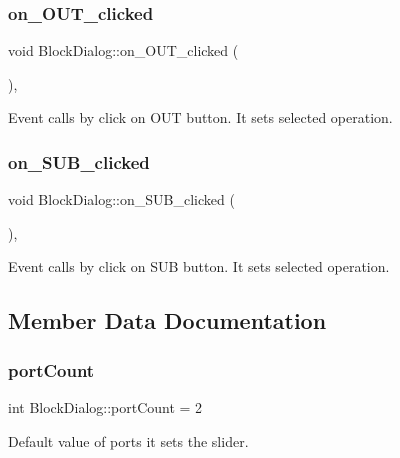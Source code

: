 \subsubsection{\texorpdfstring{on\+\_\+\+O\+U\+T\+\_\+clicked}{on\_OUT\_clicked}}
{\footnotesize\ttfamily void Block\+Dialog\+::on\+\_\+\+O\+U\+T\+\_\+clicked (\begin{DoxyParamCaption}{ }\end{DoxyParamCaption})\hspace{0.3cm}{\ttfamily [private]}, {\ttfamily [slot]}}

Event calls by click on O\+UT button. It sets selected operation. \mbox{\label{classBlockDialog_af9974e5eed00d8ed6541207152559639}} 
\subsubsection{\texorpdfstring{on\+\_\+\+S\+U\+B\+\_\+clicked}{on\_SUB\_clicked}}
{\footnotesize\ttfamily void Block\+Dialog\+::on\+\_\+\+S\+U\+B\+\_\+clicked (\begin{DoxyParamCaption}{ }\end{DoxyParamCaption})\hspace{0.3cm}{\ttfamily [private]}, {\ttfamily [slot]}}

Event calls by click on S\+UB button. It sets selected operation. 

\subsection{Member Data Documentation}
\mbox{\label{classBlockDialog_a5d3f519ebe7794146a1f24607ab3066a}} 
\subsubsection{\texorpdfstring{port\+Count}{portCount}}
{\footnotesize\ttfamily int Block\+Dialog\+::port\+Count = 2\hspace{0.3cm}{\ttfamily [private]}}

Default value of ports it sets the slider. \mbox{\label{classBlockDialog_a369bf9158760dcf32d7c98d7f4c3fd24}} 
